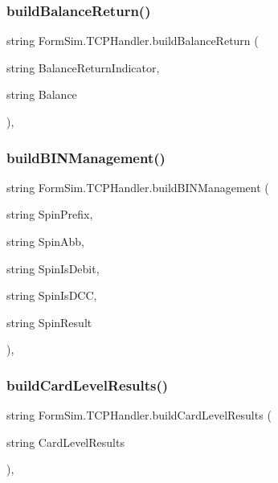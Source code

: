 \subsubsection{\texorpdfstring{build\+Balance\+Return()}{buildBalanceReturn()}}
{\footnotesize\ttfamily string Form\+Sim.\+T\+C\+P\+Handler.\+build\+Balance\+Return (\begin{DoxyParamCaption}\item[{string}]{Balance\+Return\+Indicator,  }\item[{string}]{Balance }\end{DoxyParamCaption})\hspace{0.3cm}{\ttfamily [inline]}, {\ttfamily [private]}}

\mbox{\label{class_form_sim_1_1_t_c_p_handler_a74f16929ee87f2adcd72cb83041cb1c8}} 
\subsubsection{\texorpdfstring{build\+B\+I\+N\+Management()}{buildBINManagement()}}
{\footnotesize\ttfamily string Form\+Sim.\+T\+C\+P\+Handler.\+build\+B\+I\+N\+Management (\begin{DoxyParamCaption}\item[{string}]{Spin\+Prefix,  }\item[{string}]{Spin\+Abb,  }\item[{string}]{Spin\+Is\+Debit,  }\item[{string}]{Spin\+Is\+D\+CC,  }\item[{string}]{Spin\+Result }\end{DoxyParamCaption})\hspace{0.3cm}{\ttfamily [inline]}, {\ttfamily [private]}}

\mbox{\label{class_form_sim_1_1_t_c_p_handler_a059fa8efc59b79fcc0431b98692ef340}} 
\subsubsection{\texorpdfstring{build\+Card\+Level\+Results()}{buildCardLevelResults()}}
{\footnotesize\ttfamily string Form\+Sim.\+T\+C\+P\+Handler.\+build\+Card\+Level\+Results (\begin{DoxyParamCaption}\item[{string}]{Card\+Level\+Results }\end{DoxyParamCaption})\hspace{0.3cm}{\ttfamily [inline]}, {\ttfamily [private]}}

